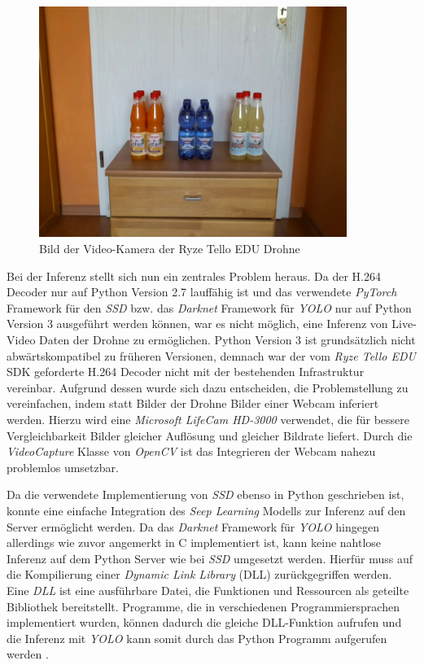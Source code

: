 \begin{figure}[H]
	\begin{center}
		\includegraphics[width=10cm]{Bilder/gesamt.jpeg}
		\caption[Bild der Video-Kamera der Ryze Tello EDU Drohne]{Bild der Video-Kamera der Ryze Tello EDU Drohne}
		\label{rauschen}
	\end{center}
\end{figure}

Bei der Inferenz stellt sich nun ein zentrales Problem heraus. Da der H.264 Decoder nur auf Python Version 2.7 lauffähig ist und das verwendete \textit{PyTorch} Framework für den \textit{SSD} bzw. das \textit{Darknet} Framework für \textit{YOLO} nur auf Python Version 3 ausgeführt werden können, war es nicht möglich, eine Inferenz von Live-Video Daten der Drohne zu ermöglichen. Python Version 3 ist grundsätzlich nicht abwärtskompatibel zu früheren Versionen, demnach war der vom \textit{Ryze Tello EDU} SDK geforderte H.264 Decoder nicht mit der bestehenden Infrastruktur vereinbar. Aufgrund dessen wurde sich dazu entscheiden, die Problemstellung zu vereinfachen, indem statt Bilder der Drohne Bilder einer Webcam inferiert werden. Hierzu wird eine \textit{Microsoft LifeCam HD-3000} verwendet, die für bessere Vergleichbarkeit Bilder gleicher Auflösung und gleicher Bildrate liefert. Durch die \textit{VideoCapture} Klasse von \textit{OpenCV} ist das Integrieren der Webcam nahezu problemlos umsetzbar. 

Da die verwendete Implementierung von \textit{SSD} ebenso in Python geschrieben ist, konnte eine einfache Integration des \textit{Seep Learning} Modells zur Inferenz auf den Server ermöglicht werden. Da das \textit{Darknet} Framework für \textit{YOLO} hingegen allerdings wie zuvor angemerkt in C implementiert ist, kann keine nahtlose Inferenz auf dem Python Server wie bei \textit{SSD} umgesetzt werden. Hierfür muss auf die Kompilierung einer \textit{Dynamic Link Library} (DLL) zurückgegriffen werden. Eine \textit{DLL} ist eine ausführbare Datei, die Funktionen und Ressourcen als geteilte Bibliothek bereitstellt. Programme, die in verschiedenen Programmiersprachen implementiert wurden, können dadurch die gleiche DLL-Funktion aufrufen und die Inferenz mit \textit{YOLO} kann somit durch das Python Programm aufgerufen werden \cite{MicrosoftCorporation.27.01.2020}.
